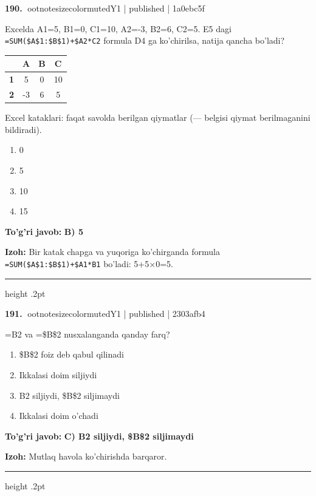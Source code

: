 \documentclass[10pt,a4paper]{article}
\begin{document}
\textbf{\color{ink}190.} {ootnotesizecolor{muted}Y1 | published | 1a0ebc5f}
\par
Excelda A1=5, B1=0, C1=10, A2=-3, B2=6, C2=5. E5 dagi \texttt{=SUM(\$A\$1:\$B\$1)+\$A2*C2} formula D4 ga ko'chirilsa, natija qancha bo'ladi?
\begin{center}\begingroup\small\setlength{\tabcolsep}{9pt}\renewcommand{\arraystretch}{1.28}
\begin{tabular}{|>{\columncolor{gray!12}}c|c|c|c|}
\hline
\rowcolor{gray!12} \textbf{} & \textbf{A} & \textbf{B} & \textbf{C}\\ \hline
\textbf{1} & 5 & 0 & 10\\ \hline
\textbf{2} & -3 & 6 & 5\\ \hline
\end{tabular}\endgroup\par{\footnotesize\color{muted}Excel kataklari: faqat savolda berilgan qiymatlar (--- belgisi qiymat berilmaganini bildiradi).}\end{center}
\begin{enumerate}[label=\Alph*),leftmargin=9mm]
\item 0
\item 5
\item 10
\item 15
\end{enumerate}
\begin{tcolorbox}[enhanced,breakable,colback=teal!4,colframe=teal!55!black,boxrule=0.45pt,arc=1.2mm,left=2.8mm,right=2.8mm,top=2mm,bottom=2mm]
\textbf{\color{teal}To'g'ri javob:} \textbf{B) 5}
\par\smallskip
\textbf{Izoh:} Bir katak chapga va yuqoriga ko'chirganda formula \texttt{=SUM(\$A\$1:\$B\$1)+\$A1*B1} bo'ladi: 5+5\ensuremath{\times}0=5.
\end{tcolorbox}
\vspace{2mm}\hrule height .2pt\vspace{2mm}

\textbf{\color{ink}191.} {ootnotesizecolor{muted}Y1 | published | 2303afb4}
\par
=B2 va =\$B\$2 nusxalanganda qanday farq?
\begin{enumerate}[label=\Alph*),leftmargin=9mm]
\item \$B\$2 foiz deb qabul qilinadi
\item Ikkalasi doim siljiydi
\item B2 siljiydi, \$B\$2 siljimaydi
\item Ikkalasi doim o'chadi
\end{enumerate}
\begin{tcolorbox}[enhanced,breakable,colback=teal!4,colframe=teal!55!black,boxrule=0.45pt,arc=1.2mm,left=2.8mm,right=2.8mm,top=2mm,bottom=2mm]
\textbf{\color{teal}To'g'ri javob:} \textbf{C) B2 siljiydi, \$B\$2 siljimaydi}
\par\smallskip
\textbf{Izoh:} Mutlaq havola ko'chirishda barqaror.
\end{tcolorbox}
\vspace{2mm}\hrule height .2pt\vspace{2mm}
\end{document}
